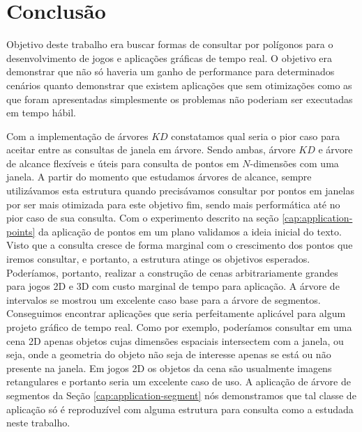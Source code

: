 \chapter{Conclusão}
Objetivo deste trabalho era buscar formas de consultar por polígonos para o desenvolvimento de jogos e aplicações gráficas de tempo real. O objetivo era demonstrar que não só haveria um ganho de performance para determinados cenários quanto demonstrar que existem aplicações que sem otimizações como as que foram apresentadas simplesmente os problemas não poderiam ser executadas em tempo hábil.

Com a implementação de árvores $KD$ constatamos qual seria o pior caso para aceitar entre as consultas de janela em árvore. Sendo ambas, árvore $KD$ e árvore de alcance flexíveis e úteis para consulta de pontos em $N$-dimensões com uma janela. A partir do momento que estudamos árvores de alcance, sempre utilizávamos esta estrutura quando precisávamos consultar por pontos em janelas por ser mais otimizada para este objetivo fim, sendo mais performática até no pior caso de sua consulta. Com o experimento descrito na seção \ref{cap:application-points} da aplicação de pontos em um plano validamos a ideia inicial do texto. Visto que a consulta cresce de forma marginal com o crescimento dos pontos que iremos consultar, e portanto, a estrutura atinge os objetivos esperados. Poderíamos, portanto, realizar a construção de cenas arbitrariamente grandes para jogos 2D e 3D com custo marginal de tempo para aplicação. A árvore de intervalos se mostrou um excelente caso base para a árvore de segmentos. Conseguimos encontrar aplicações que seria perfeitamente aplicável para algum projeto gráfico de tempo real. Como por exemplo, poderíamos consultar em uma cena 2D apenas objetos cujas dimensões espaciais intersectem com a janela, ou seja, onde a geometria do objeto não seja de interesse apenas se está ou não presente na janela. Em jogos 2D os objetos da cena são usualmente imagens retangulares e portanto seria um excelente caso de uso. A aplicação de árvore de segmentos da Seção \ref{cap:application-segment} nós demonstramos que tal classe de aplicação só é reproduzível com alguma estrutura para consulta como a estudada neste trabalho. 

